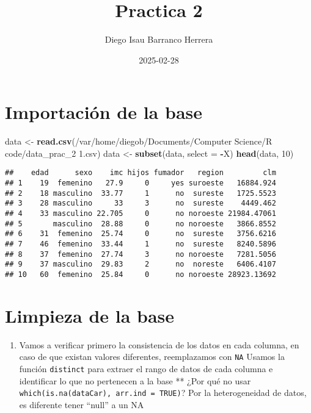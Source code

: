 \documentclass[
]{article}
\title{Practica 2}
\author{Diego Isau Barranco Herrera}
\date{2025-02-28}
\newenvironment{Shaded}{\begin{snugshade}}{\end{snugshade}}
\newcommand{\AttributeTok}[1]{\textcolor[rgb]{0.13,0.29,0.53}{#1}}
\newcommand{\DecValTok}[1]{\textcolor[rgb]{0.00,0.00,0.81}{#1}}
\newcommand{\FunctionTok}[1]{\textcolor[rgb]{0.13,0.29,0.53}{\textbf{#1}}}
\newcommand{\NormalTok}[1]{#1}
\newcommand{\OtherTok}[1]{\textcolor[rgb]{0.56,0.35,0.01}{#1}}
\newcommand{\SpecialCharTok}[1]{\textcolor[rgb]{0.81,0.36,0.00}{\textbf{#1}}}
\newcommand{\StringTok}[1]{\textcolor[rgb]{0.31,0.60,0.02}{#1}}
\providecommand{\tightlist}{%
  \setlength{\itemsep}{0pt}\setlength{\parskip}{0pt}}
\begin{document}
\maketitle

\section{Importación de la base}\label{importaciuxf3n-de-la-base}

\begin{Shaded}
\begin{Highlighting}[]
\NormalTok{data }\OtherTok{\textless{}{-}} \FunctionTok{read.csv}\NormalTok{(}\StringTok{\textquotesingle{}/var/home/diegob/Documents/Computer Science/R code/data\_prac\_2 1.csv\textquotesingle{}}\NormalTok{)}
\NormalTok{data }\OtherTok{\textless{}{-}} \FunctionTok{subset}\NormalTok{(data, }\AttributeTok{select =} \SpecialCharTok{{-}}\NormalTok{X)}
\FunctionTok{head}\NormalTok{(data, }\DecValTok{10}\NormalTok{)}
\end{Highlighting}
\end{Shaded}

\begin{verbatim}
##    edad      sexo    imc hijos fumador   region         clm
## 1    19  femenino   27.9     0     yes suroeste   16884.924
## 2    18 masculino  33.77     1      no  sureste   1725.5523
## 3    28 masculino     33     3      no  sureste    4449.462
## 4    33 masculino 22.705     0      no noroeste 21984.47061
## 5       masculino  28.88     0      no noroeste   3866.8552
## 6    31  femenino  25.74     0      no  sureste   3756.6216
## 7    46  femenino  33.44     1      no  sureste   8240.5896
## 8    37  femenino  27.74     3      no noroeste   7281.5056
## 9    37 masculino  29.83     2      no  noreste   6406.4107
## 10   60  femenino  25.84     0      no noroeste 28923.13692
\end{verbatim}

\section{Limpieza de la base}\label{limpieza-de-la-base}

\begin{enumerate}
\def\labelenumi{\arabic{enumi}.}
\tightlist
\item
  Vamos a verificar primero la consistencia de los datos en cada
  columna, en caso de que existan valores diferentes, reemplazamos con
  \texttt{NA} Usamos la función \texttt{distinct} para extraer el rango
  de datos de cada columna e identificar lo que no pertenecen a la base
  ** ¿Por qué no usar \texttt{which(is.na(dataCar),\ arr.ind\ =\ TRUE)}?
  Por la heterogeneidad de datos, es diferente tener ``null'' a un NA
\end{enumerate}
\end{document}
